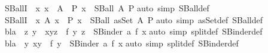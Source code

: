 \begin{isabellebody}
{\isacharverbatimclose}%
\endisatagML
{\isafoldML}%
%
\isadelimML
%
\endisadelimML
\isanewline
\isanewline
{}\isamarkupfalse%
\ SBall{\isacharunderscore}I\ {\isacharcolon}\ {\isachardoublequoteopen}{\isacharparenleft}{\isasymAnd}x{\isachardot}\ x\ {\isasymin}\ A\ {\isasymLongrightarrow}\ P\ x{\isacharparenright}\ {\isasymLongrightarrow}\ SBall\ A\ P{\isachardoublequoteclose}\isanewline
%
\isadelimproof
%
\endisadelimproof
%
\isatagproof
{}\isamarkupfalse%
{\isacharparenleft}auto\ simp{\isacharcolon}\ SBall{\isacharunderscore}def{\isacharparenright}%
\endisatagproof
{\isafoldproof}%
%
\isadelimproof
\isanewline
%
\endisadelimproof
\isanewline
{}\isamarkupfalse%
\ SBall{\isacharunderscore}I{}\ {\isacharcolon}\ {\isachardoublequoteopen}{\isacharparenleft}{\isasymAnd}x{\isachardot}\ A\ x\ {\isacharequal}{\isacharequal}{\isachargreater}\ P\ x{\isacharparenright}\ {\isacharequal}{\isacharequal}{\isachargreater}\ SBall\ {\isacharparenleft}asSet\ A{\isacharparenright}\ P{\isachardoublequoteclose}\isanewline
%
\isadelimproof
%
\endisadelimproof
%
\isatagproof
{}\isamarkupfalse%
{\isacharparenleft}auto\ simp{\isacharcolon}\ asSet{\isacharunderscore}def\ SBall{\isacharunderscore}def{\isacharparenright}%
\endisatagproof
{\isafoldproof}%
%
\isadelimproof
\isanewline
%
\endisadelimproof
\isanewline
{}\isamarkupfalse%
\ bla\ {\isacharcolon}\ {\isachardoublequoteopen}{\isacharparenleft}{\isasymAnd}z\ y\ {\isachardot}\ x{\isacharequal}{\isacharparenleft}y{\isacharcomma}z{\isacharparenright}\ {\isasymLongrightarrow}\ f\ y\ z{\isacharparenright}\ {\isasymLongrightarrow}\ {\isacharparenleft}SBinder\ a\ f{\isacharparenright}\ x{\isachardoublequoteclose}\isanewline
%
\isadelimproof
%
\endisadelimproof
%
\isatagproof
{}\isamarkupfalse%
{\isacharparenleft}auto\ simp{\isacharcolon}\ split{\isacharunderscore}def\ SBinder{\isacharunderscore}def{\isacharparenright}%
\endisatagproof
{\isafoldproof}%
%
\isadelimproof
\isanewline
%
\endisadelimproof
\isanewline
{}\isamarkupfalse%
\ bla{}\ {\isacharcolon}\ {\isachardoublequoteopen}{\isacharparenleft}{\isasymAnd}y{\isachardot}\ x{\isacharequal}y\ {\isasymLongrightarrow}\ f\ y{\isacharparenright}\ {\isasymLongrightarrow}\ {\isacharparenleft}SBinder{}\ a\ f{\isacharparenright}\ x{\isachardoublequoteclose}\isanewline
%
\isadelimproof
%
\endisadelimproof
%
\isatagproof
{}\isamarkupfalse%
{\isacharparenleft}auto\ simp{\isacharcolon}\ split{\isacharunderscore}def\ SBinder{}{\isacharunderscore}def{\isacharparenright}%

\end{isabellebody}
